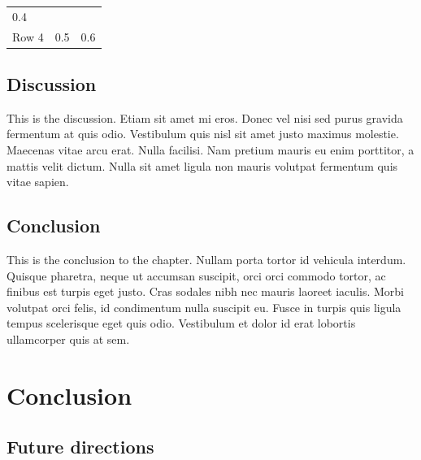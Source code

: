 \documentclass[12pt,a4paper,]{report}
\begin{document}
\begin{longtable}[]{@{}lll@{}}
\begin{minipage}[t]{0.24\columnwidth}\raggedright\strut
0.4
\strut\end{minipage}\tabularnewline
\begin{minipage}[t]{0.25\columnwidth}\raggedright\strut
Row 4
\strut\end{minipage} &
\begin{minipage}[t]{0.30\columnwidth}\raggedright\strut
0.5
\strut\end{minipage} &
\begin{minipage}[t]{0.24\columnwidth}\raggedright\strut
0.6
\strut\end{minipage}\tabularnewline
\bottomrule
\end{longtable}

\section{Discussion}\label{discussion-3}

This is the discussion. Etiam sit amet mi eros. Donec vel nisi sed purus
gravida fermentum at quis odio. Vestibulum quis nisl sit amet justo
maximus molestie. Maecenas vitae arcu erat. Nulla facilisi. Nam pretium
mauris eu enim porttitor, a mattis velit dictum. Nulla sit amet ligula
non mauris volutpat fermentum quis vitae sapien.

\section{Conclusion}\label{conclusion-3}

This is the conclusion to the chapter. Nullam porta tortor id vehicula
interdum. Quisque pharetra, neque ut accumsan suscipit, orci orci
commodo tortor, ac finibus est turpis eget justo. Cras sodales nibh nec
mauris laoreet iaculis. Morbi volutpat orci felis, id condimentum nulla
suscipit eu. Fusce in turpis quis ligula tempus scelerisque eget quis
odio. Vestibulum et dolor id erat lobortis ullamcorper quis at sem.

\chapter{Conclusion}\label{conclusion-4}

\section{Future directions}\label{future-directions}
\end{document}

